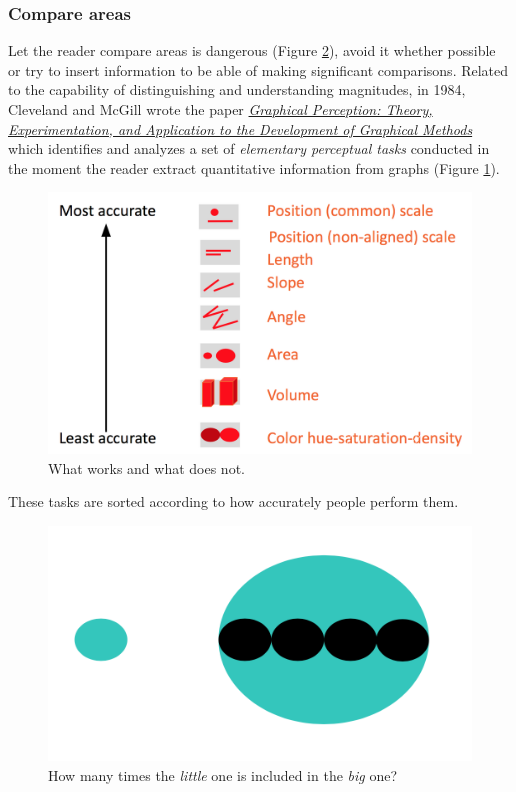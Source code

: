 \subsubsection*{Compare areas}

Let the reader compare areas is dangerous (Figure  \ref{pic:area}), avoid it whether possible or try to insert information to be able of making significant comparisons. Related to the capability of distinguishing and understanding magnitudes, in 1984, Cleveland and McGill wrote the paper
\href{https://www.cs.ubc.ca/\~tmm/courses/cpsc533c-04-spr/readings/cleveland.pdf}{\emph{Graphical Perception: Theory, Experimentation, and Application to the Development of Graphical Methods}} which identifies and analyzes a set of \emph{elementary perceptual tasks} conducted in the moment the reader extract quantitative information from graphs (Figure \ref{pic:magnitude}). 

\begin{figure}[H]%
 \centering
 \includegraphics[width=13cm]{./img/06/magnitude}
 \caption{\label{pic:magnitude} What works and what does not.}
\end{figure}


These tasks are sorted according to how accurately people perform them.

\begin{figure}[h]%
 \centering
 \includegraphics[width=13cm]{./img/06/area}
 \caption{\label{pic:area} How many times the \emph{little} one is included in the \emph{big} one?}
\end{figure}

